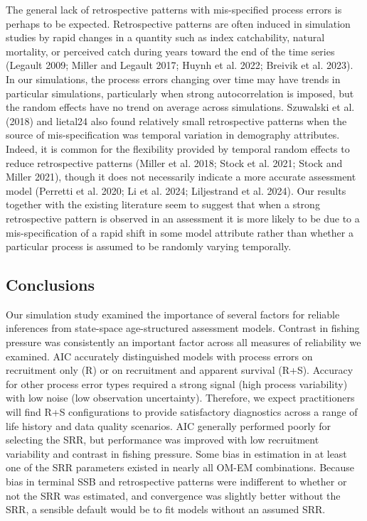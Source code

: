 \documentclass[
  12pt,
]{article}
\begin{document}
The general lack of retrospective patterns with mis-specified process
errors is perhaps to be expected. Retrospective patterns are often
induced in simulation studies by rapid changes in a quantity such as
index catchability, natural mortality, or perceived catch during years
toward the end of the time series (Legault 2009; Miller and Legault
2017; Huynh et al. 2022; Breivik et al. 2023). In our simulations, the
process errors changing over time may have trends in particular
simulations, particularly when strong autocorrelation is imposed, but
the random effects have no trend on average across simulations.
Szuwalski et al. (2018) and lietal24 also found relatively small
retrospective patterns when the source of mis-specification was temporal
variation in demography attributes. Indeed, it is common for the
flexibility provided by temporal random effects to reduce retrospective
patterns (Miller et al. 2018; Stock et al. 2021; Stock and Miller 2021),
though it does not necessarily indicate a more accurate assessment model
(Perretti et al. 2020; Li et al. 2024; Liljestrand et al. 2024). Our
results together with the existing literature seem to suggest that when
a strong retrospective pattern is observed in an assessment it is more
likely to be due to a mis-specification of a rapid shift in some model
attribute rather than whether a particular process is assumed to be
randomly varying temporally.

\subsection*{Conclusions}\label{conclusions}

Our simulation study examined the importance of several factors for
reliable inferences from state-space age-structured assessment models.
Contrast in fishing pressure was consistently an important factor across
all measures of reliability we examined. AIC accurately distinguished
models with process errors on recruitment only (R) or on recruitment and
apparent survival (R+S). Accuracy for other process error types required
a strong signal (high process variability) with low noise (low
observation uncertainty). Therefore, we expect practitioners will find
R+S configurations to provide satisfactory diagnostics across a range of
life history and data quality scenarios. AIC generally performed poorly
for selecting the SRR, but performance was improved with low recruitment
variability and contrast in fishing pressure. Some bias in estimation in
at least one of the SRR parameters existed in nearly all OM-EM
combinations. Because bias in terminal SSB and retrospective patterns
were indifferent to whether or not the SRR was estimated, and
convergence was slightly better without the SRR, a sensible default
would be to fit models without an assumed SRR.
\end{document}

